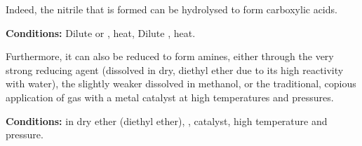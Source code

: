 


				\hypertarget{NitrileUses}{}
				Indeed, the nitrile that is formed can be hydrolysed to form carboxylic acids.

				\vspace{1.5em}
				\vbox{\textbf{Conditions:}	\tabto{35mm}Dilute  or , heat, 
											\tabto{35mm}Dilute , heat.}




				Furthermore, it can also be reduced to form amines, either through the very strong reducing agent 
				(dissolved in dry, diethyl ether due to its high reactivity with water), the slightly weaker  dissolved in
				methanol, or the traditional, copious application of  gas with a metal catalyst at high temperatures and pressures.

				\vspace{1.5em}
				\vbox{\textbf{Conditions:}	\tabto{35mm} in dry ether (diethyl ether), 
											\tabto{35mm},  catalyst, high temperature and pressure.}






